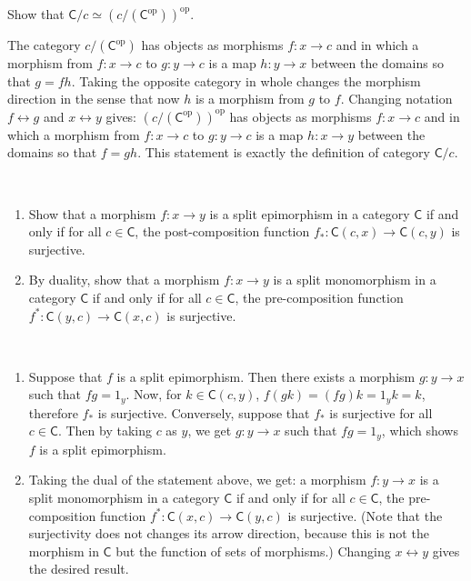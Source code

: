 \begin{exer} Show that $\mathsf{C}/c\simeq (c/(\mathsf{C}^{\mathrm{op}}))^{\mathrm{op}}$.
\end{exer}
\begin{solution} The category $c/(\mathsf{C}^{\mathrm{op}})$ has objects as morphisms $f:x\rightarrow c$ and in which a morphism from $f:x\rightarrow c$ to $g:y\rightarrow c$ is a map $h:y\rightarrow x$ between the domains so that $g=fh$. Taking the opposite category in whole changes the morphism direction in the sense that now $h$ is a morphism from $g$ to $f$. Changing notation $f\leftrightarrow g$ and $x\leftrightarrow y$ gives: $(c/(\mathsf{C}^{\mathrm{op}}))^{\mathrm{op}}$ has objects as morphisms $f:x\rightarrow c$ and in which a morphism from $f:x\rightarrow c$ to $g:y\rightarrow c$ is a map $h:x\rightarrow y$ between the domains so that $f=gh$. This statement is exactly the definition of category $\mathsf{C}/c$.
\end{solution}

\begin{exer}
~\begin{enumerate}
\item Show that a morphism $f:x\rightarrow y$ is a split epimorphism in a category $\mathsf{C}$ if and only if for all $c\in \mathsf{C}$, the post-composition function $f_*:\mathsf{C}(c,x)\rightarrow \mathsf{C}(c,y)$ is surjective.
\item By duality, show that a morphism $f:x\rightarrow y$ is a split monomorphism in a category $\mathsf{C}$ if and only if for all $c\in \mathsf{C}$, the pre-composition function $f^*:\mathsf{C}(y,c)\rightarrow \mathsf{C}(x,c)$ is surjective.
\end{enumerate}
\end{exer}
\begin{solution}
~\begin{enumerate}
\item Suppose that $f$ is a split epimorphism. Then there exists a morphism $g:y\rightarrow x$ such that $fg=1_y$. Now, for $k\in \mathsf{C}(c,y)$, $f(gk)=(fg)k=1_y k=k$, therefore $f_*$ is surjective. Conversely, suppose that $f_*$ is surjective for all $c\in\mathsf{C}$. Then by taking $c$ as $y$, we get $g:y\rightarrow x$ such that $fg=1_y$, which shows $f$ is a split epimorphism.
\item Taking the dual of the statement above, we get: a morphism $f:y\rightarrow x$ is a split monomorphism in a category $\mathsf{C}$ if and only if for all $c\in \mathsf{C}$, the pre-composition function $f^*:\mathsf{C}(x,c)\rightarrow \mathsf{C}(y,c)$ is surjective. (Note that the surjectivity does not changes its arrow direction, because this is not the morphism in $\mathsf{C}$ but the function of sets of morphisms.) Changing $x\leftrightarrow y$ gives the desired result.
\end{enumerate}
\end{solution}

